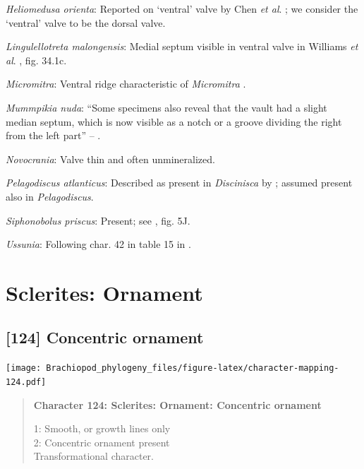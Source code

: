 \documentclass[openany]{book}
\begin{document}
\hypertarget{Heliomedusa_orienta-coding-123}{}
\emph{Heliomedusa orienta}: Reported on `ventral' valve by Chen \emph{et
al}. \citeyearpar{Chen2007Reinterpretationof}; we consider the `ventral'
valve to be the dorsal valve.

\hypertarget{Lingulellotreta_malongensis-coding-123}{}
\emph{Lingulellotreta malongensis}: Medial septum visible in ventral
valve in Williams \emph{et al}.
\citeyearpar{Williams2000LinguliformeaCraniiformea}, fig. 34.1c.

\hypertarget{Micromitra-coding-123}{}
\emph{Micromitra}: Ventral ridge characteristic of \emph{Micromitra}
\citep{Skovsted2010EarlyCambrian}.

\hypertarget{Mummpikia_nuda-coding-123}{}
\emph{Mummpikia nuda}: ``Some specimens also reveal that the vault had a
slight median septum, which is now visible as a notch or a groove
dividing the right from the left part'' --
\citet{Balthasar2008iMummpikia}.

\hypertarget{Novocrania-coding-123}{}
\emph{Novocrania}: Valve thin and often unmineralized.

\hypertarget{Pelagodiscus_atlanticus-coding-123}{}
\emph{Pelagodiscus atlanticus}: Described as present in
\emph{Discinisca} by \citet{Chen2007Reinterpretationof}; assumed present
also in \emph{Pelagodiscus}.

\hypertarget{Siphonobolus_priscus-coding-123}{}
\emph{Siphonobolus priscus}: Present; see
\citet{Popov2009Earlyontogeny}, fig. 5J.

\hypertarget{Ussunia-coding-123}{}
\emph{Ussunia}: Following char. 42 in table 15 in
\citet{Williams2000LinguliformeaCraniiformea}.

\section{Sclerites: Ornament}\label{sclerites-ornament}

\subsection*{{[}124{]} Concentric ornament}\label{concentric-ornament}

\texttt{[image: Brachiopod\_phylogeny\_files/figure-latex/character-mapping-124.pdf]}

\begin{quote}
\textbf{Character 124: Sclerites: Ornament: Concentric ornament}

1: Smooth, or growth lines only\\
2: Concentric ornament present\\
Transformational character.
\end{quote}
\end{document}
